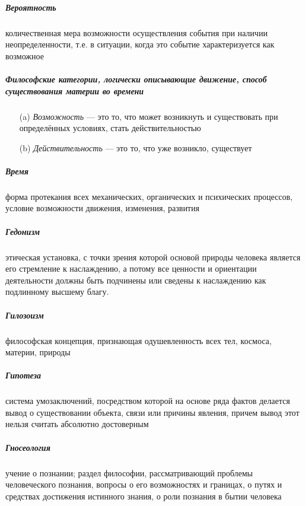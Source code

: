 \documentclass[a4paper, 12pt]{article}
\theoremstyle{plain} %
\theoremstyle{definition} %
\theoremstyle{remark} %
\begin{document}
\subparagraph{Вероятность}
    количественная мера возможности осуществления события при наличии неопределенности, т.е. в ситуации, когда это событие характеризуется как возможное

\subparagraph{Философские категории, логически описывающие движение, способ существования материи во времени}
    \begin{itemize}
        \item[(a)] \emph{Возможность} --- это то, что может возникнуть и существовать при определённых условиях, стать действительностью
        \item[(b)] \emph{Действительность} --- это то, что уже возникло, существует
    \end{itemize}

\subparagraph{Время}
    форма протекания всех механических, органических и психических процессов, условие возможности движения, изменения, развития

\subparagraph{Гедонизм}
    этическая установка, с точки зрения которой основой природы человека является его стремление к наслаждению, а потому все ценности и ориентации деятельности должны быть подчинены или сведены к наслаждению как подлинному высшему благу.

\subparagraph{Гилозоизм}
    философская концепция, признающая одушевленность всех тел, космоса, материи, природы

\subparagraph{Гипотеза}
    система умозаключений, посредством которой на основе ряда фактов делается вывод о существовании объекта, связи или причины явления, причем вывод этот нельзя считать абсолютно достоверным

\subparagraph{Гносеология}
    учение о познании; раздел философии, рассматривающий проблемы человеческого познания, вопросы о его возможностях и границах, о путях и средствах достижения истинного знания, о роли познания в бытии человека
\end{document}
